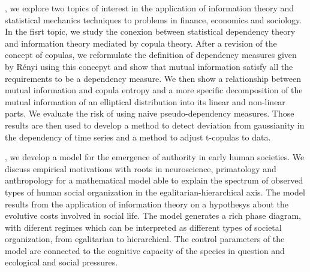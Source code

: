 , we explore two topics of interest in the application of information theory and statistical mechanics techniques to problems in finance, economics and sociology. In the fisrt topic, we study the conexion between statistical dependency theory and information theory mediated by copula theory. After a revision of the concept of copulas, we reformulate the definition of dependency measures given by Rényi \cite{Renyi1959} using this concepyt and show that mutual information satisfy all the requirements to be a dependency measure. We then show a relationship between mutual information and copula entropy and a more specific decomposition of the mutual information of an elliptical distribution into its linear and non-linear parts. We evaluate the risk of using naive pseudo-dependency measures. Those results are then used to develop a method to detect deviation from gaussianity in the dependency of time series and a method to adjust t-copulas to data\cite{Calsaverini2009}.

, we develop a model for the emergence of authority in early human societies. We discuss empirical motivations with roots in neuroscience, primatology and anthropology for a mathematical model able to explain the spectrum of observed types of human social organization in the egalitarian-hierarchical axis. The model results from the application of information theory on a hypothesys about the evolutive costs involved in social life. The model generates a rich phase diagram, with diferent regimes which can be interpreted as different types of societal organization, from egalitarian to hierarchical. The control parameters of the model are connected to the cognitive capacity of the species in question and ecological and social pressures.